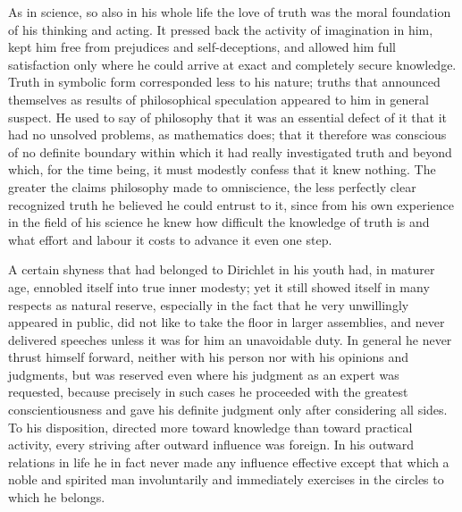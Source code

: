 \documentclass[11pt]{article}
\begin{document}
As in science, so also in his whole life the love of truth was the moral foundation of his thinking and acting. It pressed back the activity of imagination in him, kept him free from prejudices and self-deceptions, and allowed him full satisfaction only where he could arrive at exact and completely secure knowledge. Truth in symbolic form corresponded less to his nature; truths that announced themselves as results of philosophical speculation appeared to him in general suspect. He used to say of philosophy that it was an essential defect of it that it had no unsolved problems, as mathematics does; that it therefore was conscious of no definite boundary within which it had really investigated truth and beyond which, for the time being, it must modestly confess that it knew nothing. The greater the claims philosophy made to omniscience, the less perfectly clear recognized truth he believed he could entrust to it, since from his own experience in the field of his science he knew how difficult the knowledge of truth is and what effort and labour it costs to advance it even one step.

A certain shyness that had belonged to Dirichlet in his youth had, in maturer age, ennobled itself into true inner modesty; yet it still showed itself in many respects as natural reserve, especially in the fact that he very unwillingly appeared in public, did not like to take the floor in larger assemblies, and never delivered speeches unless it was for him an unavoidable duty. In general he never thrust himself forward, neither with his person nor with his opinions and judgments, but was reserved even where his judgment as an expert was requested, because precisely in such cases he proceeded with the greatest conscientiousness and gave his definite judgment only after considering all sides. To his disposition, directed more toward knowledge than toward practical activity, every striving after outward influence was foreign. In his outward relations in life he in fact never made any influence effective except that which a noble and spirited man involuntarily and immediately exercises in the circles to which he belongs.
\end{document}

